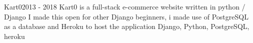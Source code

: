 \begin{projects}
	\project
	{Kart0}{2013 - 2018}
	{  }
	{
		Kart0 is a full-stack e-commerce website written in python / Django I made this open for other Django beginners, i made use of PostgreSQL as a database and Heroku to host the application 
		}
	{Django, Python, PostgreSQL, heroku} 



\end{projects}
